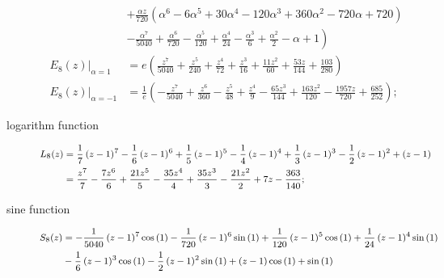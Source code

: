 \begin{description}
\begin{displaymath}
\begin{split}
                                &+ \frac{\alpha z}{720} \left(\alpha^{6} - 6 \alpha^{5} + 30 \alpha^{4} - 120 \alpha^{3} + 360 \alpha^{2} - 720 \alpha + 720\right) \\
                                &- \left.\frac{\alpha^{7}}{5040} + \frac{\alpha^{6}}{720} - \frac{\alpha^{5}}{120} + \frac{\alpha^{4}}{24} - \frac{\alpha^{3}}{6} + \frac{\alpha^{2}}{2} -\alpha + 1\right) \\
        \left.E_{8}{\left (z \right )}\right|_{\alpha=1} &= e \left(\frac{z^{7}}{5040} + \frac{z^{5}}{240} + \frac{z^{4}}{72} + \frac{z^{3}}{16} + \frac{11 z^{2}}{60} + \frac{53 z}{144} + \frac{103}{280}\right)\\
        \left.E_{8}{\left (z \right )}\right|_{\alpha=-1} &=\frac{1}{e} \left( - \frac{z^{7}}{5040} + \frac{z^{6}}{360} - \frac{z^{5}}{48} + \frac{z^{4}}{9}\right. - \left.\frac{65 z^{3}}{144} + \frac{163 z^{2}}{120} - \frac{1957 z}{720} + \frac{685}{252}\right);
    \end{split}
\end{displaymath}
\item[logarithm function]
\begin{displaymath}
\footnotesize
    \begin{split}
        L_{8}{\left (z \right )}    &= \frac{1}{7} \left(z - 1\right)^{7} - \frac{1}{6} \left(z - 1\right)^{6} + \frac{1}{5} \left(z - 1\right)^{5} - \frac{1}{4} \left(z - 1\right)^{4} + \frac{1}{3} \left(z - 1\right)^{3} - \frac{1}{2} \left(z - 1\right)^{2} + (z - 1)\\
                                &= \frac{z^{7}}{7} - \frac{7 z^{6}}{6} + \frac{21 z^{5}}{5} - \frac{35 z^{4}}{4} + \frac{35 z^{3}}{3} - \frac{21 z^{2}}{2} + 7 z - \frac{363}{140};
    \end{split}
\end{displaymath}
\item[sine function]
\begin{displaymath}
    \footnotesize
    \begin{split}
        S_{8}{\left (z \right )} &= - \frac{1}{5040} \left(z - 1\right)^{7} \cos{\left (1 \right )} - \frac{1}{720} \left(z - 1\right)^{6} \sin{\left (1 \right )} + \frac{1}{120} \left(z - 1\right)^{5} \cos{\left (1 \right )} + \frac{1}{24} \left(z - 1\right)^{4} \sin{\left (1 \right )} \\
                             &- \frac{1}{6} \left(z - 1\right)^{3} \cos{\left (1 \right )} - \frac{1}{2} \left(z - 1\right)^{2} \sin{\left (1 \right )} + \left(z - 1\right) \cos{\left (1 \right )} + \sin{\left (1 \right )}\\

\end{split}
\end{displaymath}
\end{description}
